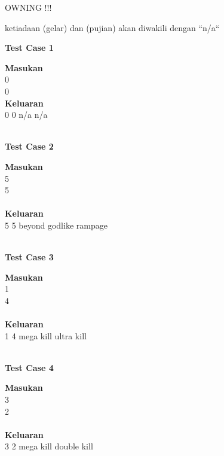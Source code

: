 \begin{permasalahan}{OWNING !!!}
	
	ketiadaan (gelar) dan (pujian) akan diwakili dengan ``n/a``

	\begin{center}
	\textbf{Test Case 1}\\
	\end{center}
	\textbf{Masukan}\\
	0 \\
	0 \\
	\textbf{Keluaran}\\
	0 0 n/a n/a\\\\
	
	\begin{center}
	\textbf{Test Case 2}\\
	\end{center}
	\textbf{Masukan}\\
	5 \\
	5 \\\\
	\textbf{Keluaran}\\
	5 5 beyond godlike rampage \\\\


	\begin{center}
	\textbf{Test Case 3}\\
	\end{center}
	\textbf{Masukan}\\
	1 \\
	4 \\\\
	\textbf{Keluaran}\\
	1 4 mega kill ultra kill \\\\
	
	\begin{center}
	\textbf{Test Case 4}\\
	\end{center}
	\textbf{Masukan}\\
	3 \\
	2 \\\\
	\textbf{Keluaran}\\
	3 2 mega kill double kill \\	
\end{permasalahan}




